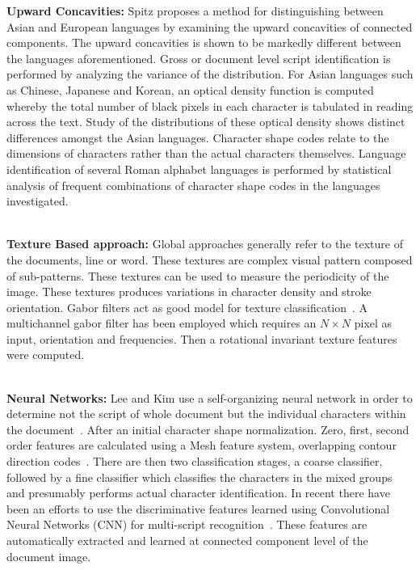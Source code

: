 \noindent\textbf{Upward Concavities:} Spitz proposes a method for distinguishing between Asian and European languages by examining the upward concavities of connected components. The upward concavities is shown to be markedly different between the languages aforementioned. Gross or document level script identification is performed by analyzing the variance of the distribution. For Asian languages such as Chinese, Japanese and Korean, an optical density function is computed whereby the total number of black pixels  in each character is tabulated in reading across the text. Study of the distributions of these optical density shows distinct differences amongst the Asian languages. Character shape codes relate to the dimensions of characters rather than the actual characters themselves. Language identification of several Roman alphabet languages is performed by statistical analysis of frequent combinations of character shape codes in the languages investigated. 
\\ 
\ 


\noindent\textbf{Texture Based approach:} 
Global approaches generally refer to the texture of the documents, line or word. These textures are complex visual pattern composed of sub-patterns. These textures can be used to measure the periodicity of the image. These textures produces variations in character density and stroke orientation. Gabor filters act as good model for texture classification~\cite{Shijian08}. A multichannel gabor filter has been employed which requires an $N\times N$ pixel as input, orientation and frequencies. Then a rotational invariant texture features were computed.
\\
\


\noindent\textbf{Neural Networks: } Lee and Kim use a self-organizing neural network in order to determine not the script of whole document but the individual characters within the document~\cite{}. After an initial character shape normalization. Zero, first, second order features are calculated using a Mesh feature system, overlapping contour direction codes~\cite{}. There are then two classification stages, a coarse classifier, followed by a fine classifier which classifies the characters in the mixed groups and presumably performs actual character identification. In recent there have been an efforts to use the discriminative features learned using Convolutional Neural Networks (\textsc{CNN}) for multi-script recognition~\cite{Rashid10}. These features are automatically extracted and learned at connected component level of the document image.
\\
\


